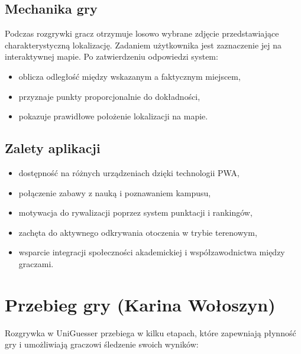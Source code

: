 \subsection{Mechanika gry}
Podczas rozgrywki gracz otrzymuje losowo wybrane zdjęcie przedstawiające charakterystyczną lokalizację. Zadaniem użytkownika jest zaznaczenie jej na interaktywnej mapie. Po zatwierdzeniu odpowiedzi system:
\begin{itemize}
    \item oblicza odległość między wskazanym a faktycznym miejscem,
    \item przyznaje punkty proporcjonalnie do dokładności,
    \item pokazuje prawidłowe położenie lokalizacji na mapie.
\end{itemize}

\subsection{Zalety aplikacji}
\begin{itemize}
    \item dostępność na różnych urządzeniach dzięki technologii PWA,
    \item połączenie zabawy z nauką i poznawaniem kampusu,
    \item motywacja do rywalizacji poprzez system punktacji i rankingów,
    \item zachęta do aktywnego odkrywania otoczenia w trybie terenowym,
    \item wsparcie integracji społeczności akademickiej i współzawodnictwa między graczami.
\end{itemize}

\section{Przebieg gry (Karina Wołoszyn)}

Rozgrywka w UniGuesser przebiega w kilku etapach, które zapewniają płynność gry i umożliwiają graczowi śledzenie swoich wyników:

